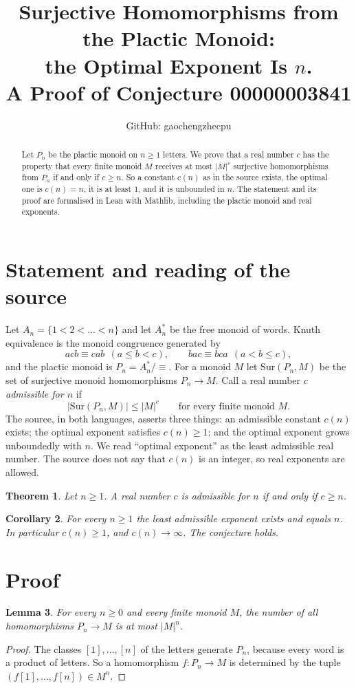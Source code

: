 \documentclass[11pt]{article}
\title{Surjective Homomorphisms from the Plactic Monoid:\\
the Optimal Exponent Is $n$.\\
A Proof of Conjecture 00000003841}
\author{GitHub: gaochengzhecpu}
\date{}
\newtheorem{theorem}{Theorem}
\newtheorem{lemma}[theorem]{Lemma}
\newtheorem{corollary}[theorem]{Corollary}
\theoremstyle{remark}
\newcommand{\Sur}{\mathrm{Sur}}
\begin{document}
\maketitle
\begin{abstract}
Let $P_n$ be the plactic monoid on $n\ge1$ letters. We prove that a real
number $c$ has the property that every finite monoid $M$ receives at
most $|M|^c$ surjective homomorphisms from $P_n$ if and only if
$c\ge n$. So a constant $c(n)$ as in the source exists, the optimal one
is $c(n)=n$, it is at least $1$, and it is unbounded in $n$. The
statement and its proof are formalised in Lean with Mathlib, including
the plactic monoid and real exponents.
\end{abstract}

\section*{Statement and reading of the source}
Let $A_n=\{1<2<\dots<n\}$ and let $A_n^*$ be the free monoid of words.
Knuth equivalence is the monoid congruence generated by
\[
 acb\equiv cab\ \ (a\le b<c),\qquad bac\equiv bca\ \ (a<b\le c),
\]
and the plactic monoid is $P_n=A_n^*/{\equiv}$. For a monoid $M$ let
$\Sur(P_n,M)$ be the set of surjective monoid homomorphisms
$P_n\to M$. Call a real number $c$ \emph{admissible for $n$} if
\[
 |\Sur(P_n,M)|\le|M|^{c}\qquad\text{for every finite monoid }M .
\]
The source, in both languages, asserts three things: an admissible
constant $c(n)$ exists; the optimal exponent satisfies $c(n)\ge1$; and
the optimal exponent grows unboundedly with $n$. We read ``optimal
exponent'' as the least admissible real number. The source does not
say that $c(n)$ is an integer, so real exponents are allowed.

\begin{theorem}\label{thm:main}
Let $n\ge1$. A real number $c$ is admissible for $n$ if and only if
$c\ge n$.
\end{theorem}

\begin{corollary}\label{cor:conj}
For every $n\ge1$ the least admissible exponent exists and equals $n$.
In particular $c(n)\ge1$, and $c(n)\to\infty$. The conjecture holds.
\end{corollary}

\section*{Proof}
\begin{lemma}\label{lem:upper}
For every $n\ge0$ and every finite monoid $M$, the number of all
homomorphisms $P_n\to M$ is at most $|M|^n$.
\end{lemma}
\begin{proof}
The classes $[1],\dots,[n]$ of the letters generate $P_n$, because
every word is a product of letters. So a homomorphism $f\colon P_n\to
M$ is determined by the tuple $(f[1],\dots,f[n])\in M^n$.
\end{proof}
\end{document}

